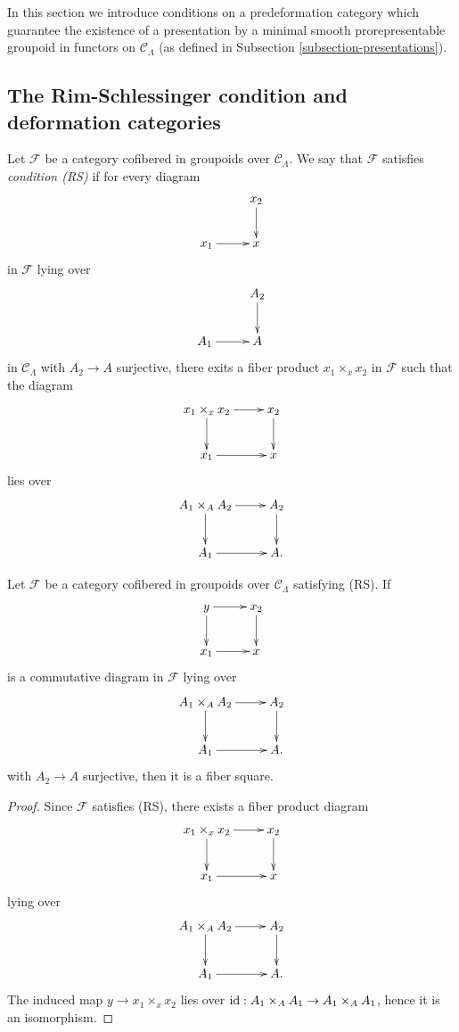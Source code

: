 \noindent
In this section we introduce conditions on a predeformation category which 
guarantee the existence of a presentation by a minimal smooth prorepresentable 
groupoid in functors on $\mathcal C_{\Lambda}$ (as defined in
Subsection \ref{subsection-presentations}).

\subsection{The Rim-Schlessinger condition and deformation categories}
\label{subsection-RS-condition}

\begin{definition}
\label{definition-RS}
Let $\mathcal F$ be a category cofibered in groupoids over $\mathcal 
C_{\Lambda}$.  We say that $\mathcal F$ satisfies {\it condition (RS)}
if for every diagram
\[
\xymatrix{
           & x_2 \ar[d] \\
x_1 \ar[r] & x   
}
\]
in $\mathcal F$ lying over
\[
\xymatrix{
           & A_2 \ar[d] \\
A_1 \ar[r] & A   
}
\]  
in $\mathcal C_{\Lambda}$ with $A_2 \rightarrow A$ surjective, there exits a 
fiber product $x_1 \times_{x} x_2$ in $\mathcal F$ such that the diagram
\[
\xymatrix{
x_1 \times_{x} x_2 \ar[r] \ar[d] & x_2 \ar[d] \\
x_1 \ar[r]      & x   
}
\]
lies over
\[
\xymatrix{
A_1 \times_{A} A_2 \ar[r] \ar[d] & A_2 \ar[d] \\
A_1 \ar[r]      & A.   
}
\]
\end{definition}

\begin{lemma}
\label{lemma-RS-fiber-square}
Let $\mathcal F$ be a category cofibered in groupoids over $\mathcal 
C_{\Lambda}$ satisfying \textnormal{(RS)}.  If
\[
\xymatrix{
y \ar[r] \ar[d] & x_2 \ar[d]   \\
x_1 \ar[r]      & x  
}
\]
is a commutative diagram in $\mathcal F$ lying over
\[
\xymatrix{
A_1 \times_{A} A_2 \ar[r] \ar[d] & A_2 \ar[d] \\
A_1 \ar[r]      & A.   
}
\]
with $A_2 \rightarrow A$ surjective, then it is a fiber square.
\end{lemma}

\begin{proof}
Since $\mathcal F$ satisfies (RS), there exists a fiber product diagram
\[
\xymatrix{
x_1 \times_{x} x_2 \ar[r] \ar[d] & x_2 \ar[d] \\
x_1 \ar[r]      & x   
}
\]
lying over 
\[
\xymatrix{
A_1 \times_{A} A_2 \ar[r] \ar[d] & A_2 \ar[d] \\
A_1 \ar[r]      & A.   
}
\]
The induced map $y \rightarrow x_1 \times_{x} x_2$ lies over $\textnormal{id}: 
A_1 \times_{A} A_1 \rightarrow A_1 \times_{A} A_1$, hence it is an isomorphism.
\end{proof}

